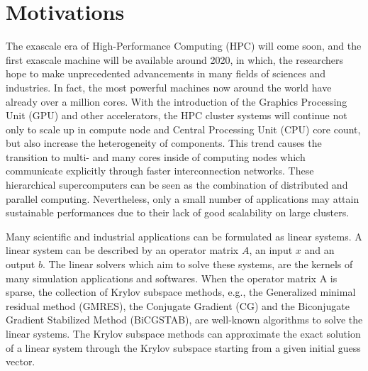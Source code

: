 \section{Motivations}

The exascale era of High-Performance Computing (HPC) will come soon, and the first exascale machine will be available around 2020, in which, the researchers hope to make unprecedented advancements in many fields of sciences and industries. In fact, the most powerful machines now around the world have already over a million cores. With the introduction of the Graphics Processing Unit (GPU) and other accelerators, the HPC cluster systems will continue not only to scale up in compute node and Central Processing Unit (CPU) core count, but also increase the heterogeneity of components. This trend causes the transition to multi- and many cores inside of computing nodes which communicate explicitly through faster interconnection networks. These hierarchical supercomputers can be seen as the combination of distributed and parallel computing. Nevertheless, only a small number of applications may attain sustainable performances due to their lack of good scalability on large clusters. 

Many scientific and industrial applications can be formulated as linear systems. A linear system can be described by an operator matrix $A$, an input $x$ and an output $b$. The linear solvers which aim to solve these systems, are the kernels of many simulation applications and softwares. When the operator matrix A is sparse, the collection of Krylov subspace methods, e.g., the Generalized minimal residual method (GMRES), the Conjugate Gradient (CG)  and the Biconjugate Gradient Stabilized Method (BiCGSTAB), are well-known algorithms to solve the linear systems. The Krylov subspace methods can approximate the exact solution of a linear system through the Krylov subspace starting from a given initial guess vector.

